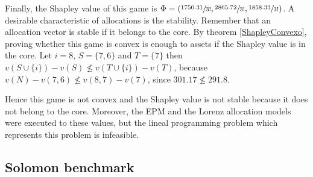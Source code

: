 \begin{table}[H]
	\centering
	
	\caption{Calculus of the Shapley value}
	\label{ShapleyCooperative}
\end{table}

Finally, the Shapley value of this game is $\Phi = (\sfrac{1750.31}{3!},\sfrac{2865.72}{3!}, \sfrac{1858.33}{3!})$. A desirable characteristic of allocations is the stability. Remember that an allocation vector is stable if it belongs to the core. By theorem \ref{ShapleyConvexo}, proving whether this game is convex is enough to assets if the Shapley value is in the core. Let $i = 8$, $S=\{7,6\}$ and $T = \{7\}$ then $v(S \cup \{i\} )- v(S) \nleq v(T \cup \{i\} )- v(T)$, because $v(N) -v(7,6) \nleq v(8,7)-v(7)$, since $301.17 \nleq 291.8$. 

Hence this game is not convex and the Shapley value is not stable because it does not belong to the core. Moreover, the EPM and the Lorenz allocation models were executed to these values, but the lineal programming problem which represents this problem is infeasible.

\subsection{Solomon benchmark}\label{CooperationSolomon}

